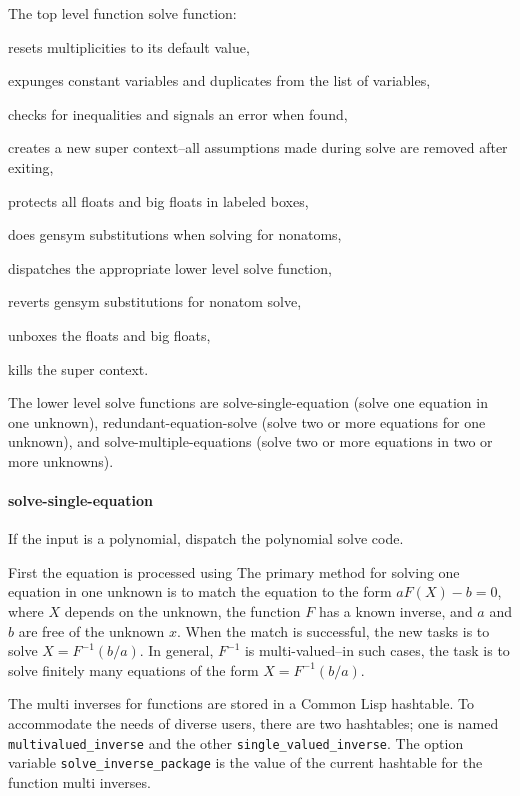 \documentclass[]{scrartcl}
\newcommand{\multivaluedinverse}{\texttt{multivalued\_inverse}}
\newcommand{\singlevaluedinverse}{\texttt{single\_valued\_inverse}}
\newcommand{\solveinversepackage}{\texttt{solve\_inverse\_package}}
\begin{document}
 The top level function solve function:
 \begin{alphalist}[noitemsep]
   \item resets multiplicities to its default value,
   \item expunges constant variables and duplicates from the list of variables,
   \item checks for inequalities and signals an error when found,
   \item creates a new super context--all assumptions made during solve are removed after exiting,
   \item protects all floats and big floats in labeled boxes,
   \item does gensym substitutions when solving for nonatoms,
   \item dispatches the appropriate lower level solve function,
   \item reverts gensym substitutions for nonatom solve,
   \item unboxes the floats and big floats,
   \item kills the super context.
\end{alphalist}

The lower level solve functions are solve-single-equation (solve one equation in one unknown), redundant-equation-solve (solve two or more equations for one unknown), and solve-multiple-equations (solve two or more equations in two or more unknowns).

\paragraph{solve-single-equation} If the input is a polynomial, dispatch the polynomial solve code.

First the equation is processed using
The primary method for solving one equation in one unknown is to match the equation to the form \(a F(X) - b = 0\), where \(X\) depends on the unknown, the function \(F\) has a known inverse, and \(a\) and \(b\) are free of the unknown \(x\). When the match is successful, the new tasks is to solve \(X = F^{-1}(b/a) \). In general, \(F^{-1}\) is multi-valued--in such cases, the task is to solve finitely many equations of the form  \(X = F^{-1}(b/a) \).

The multi inverses for functions are stored in a Common Lisp hashtable. To accommodate the needs of diverse users,
there are two hashtables; one is named \multivaluedinverse\/ and the other \singlevaluedinverse.  The option
variable \solveinversepackage\/ is the value of the current hashtable for the function multi inverses.
\end{document}
